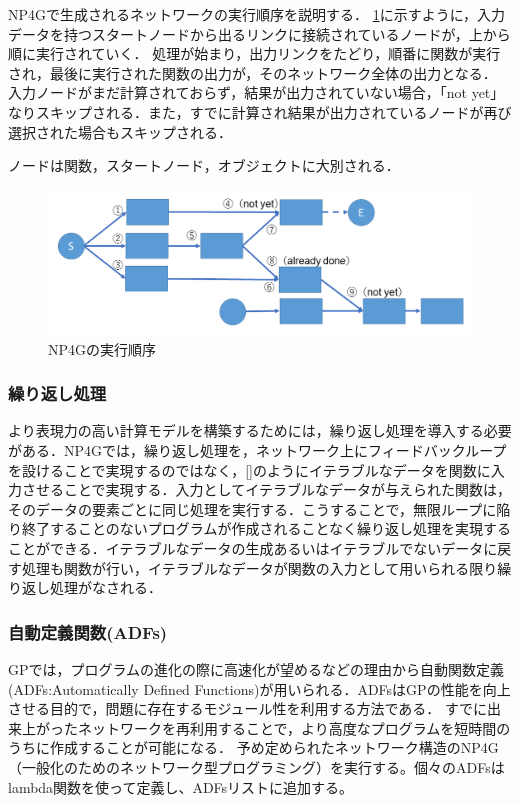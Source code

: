 \documentclass[exploratorypaper]{jsaiart} %
\begin{document}
NP4Gで生成されるネットワークの実行順序を説明する．
\ref{fig:sequence}に示すように，入力データを持つスタートノードから出るリンクに接続されているノードが，上から順に実行されていく．
処理が始まり，出力リンクをたどり，順番に関数が実行され，最後に実行された関数の出力が，そのネットワーク全体の出力となる．
入力ノードがまだ計算されておらず，結果が出力されていない場合，「not yet」なりスキップされる．また，すでに計算され結果が出力されているノードが再び選択された場合もスキップされる．

ノードは関数，スタートノード，オブジェクトに大別される．

\begin{figure}[t]
    \begin{center}
        \includegraphics[width=130mm]{sequence.png}
    \end{center}
    \capwidth=90mm %
    \caption{NP4Gの実行順序}
    \label{fig:sequence}
\end{figure}

\subsubsection{繰り返し処理}
より表現力の高い計算モデルを構築するためには，繰り返し処理を導入する必要がある．NP4Gでは，繰り返し処理を，ネットワーク上にフィードバックループを設けることで実現するのではなく，[]のようにイテラブルなデータを関数に入力させることで実現する．入力としてイテラブルなデータが与えられた関数は，そのデータの要素ごとに同じ処理を実行する．こうすることで，無限ループに陥り終了することのないプログラムが作成されることなく繰り返し処理を実現することができる．イテラブルなデータの生成あるいはイテラブルでないデータに戻す処理も関数が行い，イテラブルなデータが関数の入力として用いられる限り繰り返し処理がなされる．

\subsubsection{自動定義関数(ADFs)}
GPでは，プログラムの進化の際に高速化が望めるなどの理由から自動関数定義(ADFs:Automatically Defined Functions)\cite{adfs}が用いられる．ADFsはGPの性能を向上させる目的で，問題に存在するモジュール性を利用する方法である．
すでに出来上がったネットワークを再利用することで，より高度なプログラムを短時間のうちに作成することが可能になる．
予め定められたネットワーク構造のNP4G（一般化のためのネットワーク型プログラミング）を実行する。個々のADFsはlambda関数を使って定義し、ADFsリストに追加する。
\end{document}
